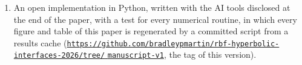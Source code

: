 \documentclass[11pt]{amsart}
\theoremstyle{definition}
\theoremstyle{remark}
\begin{document}
\begin{enumerate}
  $0.01$, $2.2$ to $7\times$ below the standard scheme at $\delta = 0.005$,
  and are $3$ to $12\times$ below it at $\delta = 0.0025$ on node sets up
  to $19{,}600$ nodes, where the zeroth-order geometry shows as $1.4$ to
  $1.5\times$ the flat seeds' error on the two finest of them.
\item An open implementation in Python, written with the AI tools
  disclosed at the end of the paper, with a test for every numerical
  routine, in which every figure and table of this paper is regenerated
  by a committed script from a results cache
  (\href{https://github.com/bradleypmartin/rbf-hyperbolic-interfaces-2026/tree/manuscript-v1}%
  {\nolinkurl{https://github.com/bradleypmartin/rbf-hyperbolic-interfaces-2026/tree/}%
  \hfil{}\hfilneg\nolinkurl{manuscript-v1}},
  the tag of this version).
\end{enumerate}
\end{document}
